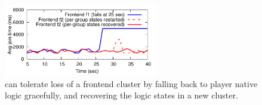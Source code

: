 \begin{figure}[t!]
\centering
\includegraphics[width=0.6\textwidth]{figures/pytheas-Eval-fault-tolerance.pdf}
\caption{\name can tolerate loss of a frontend cluster by falling back to player native logic gracefully, and recovering the logic states in a new cluster.}
\label{fig:eval-fault-tolerance}
\end{figure}

